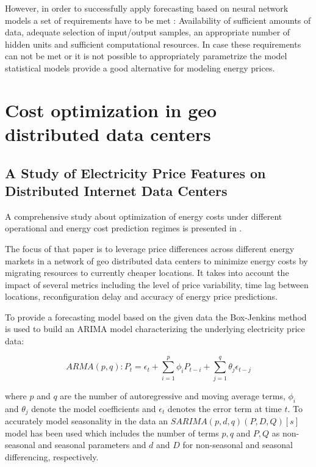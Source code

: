 However, in order to successfully apply forecasting based on neural network models a set of requirements have to be met \cite{catalao2007short}: Availability of sufficient amounts of data, adequate selection of input/output samples, an appropriate number of hidden units and sufficient computational resources. In case these requirements can not be met or it is not possible to appropriately parametrize the model statistical models provide a good alternative for modeling energy prices. 




\section{Cost optimization in geo distributed data centers}

\subsection{A Study of Electricity Price Features on Distributed Internet Data Centers}

A comprehensive study about optimization of energy costs under different operational and energy cost prediction regimes is presented in \cite{de2013study}. 

The focus of that paper is to leverage price differences across different energy markets in a network of geo distributed data centers to minimize energy costs by migrating resources to currently cheaper locations. It takes into account the impact of several metrics including the level of price variability, time lag between locations, reconfiguration delay and accuracy of energy price predictions. 

To provide a forecasting model based on the given data the Box-Jenkins method is used to build an ARIMA model characterizing the underlying electricity price data:

\[ ARMA(p,q) : P_t = \epsilon_t + \sum_{i=1}^{p}{\phi_i P_{t-i}} + \sum_{j=1}^{q}{\theta_j \epsilon_{t-j}}\] 

where $p$ and $q$ are the number of autoregressive and moving average terms, $\phi_i$ and $\theta_j$ denote the model coefficients and $\epsilon_t$ denotes the error term at time $t$. To accurately model seasonality in the data an $SARIMA(p,d,q)(P,D,Q)[s]$ model has been used which includes the number of terms $p,q$ and $P,Q$ as non-seasonal and seasonal parameters and $d$ and $D$ for non-seasonal and seasonal differencing, respectively. 

